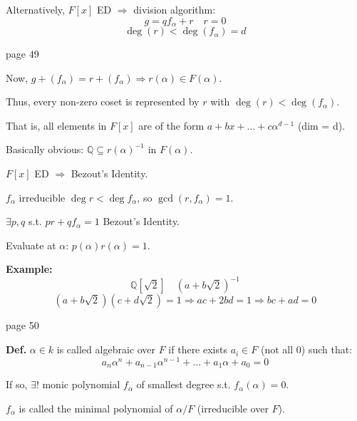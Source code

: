 \documentclass{article}
\begin{document}
Alternatively, $F[x]$ ED $\Rightarrow$ division algorithm:
\[
g = q f_\alpha + r \quad r = 0
\]
\[
\deg(r) < \deg(f_\alpha) = d
\]

\newpage
\noindent page 49

Now, $g + (f_\alpha) = r + (f_\alpha) \Rightarrow r(\alpha) \in F(\alpha)$.

Thus, every non-zero coset is represented by $r$ with $\deg(r) < \deg(f_\alpha)$.

That is, all elements in $F[x]$ are of the form $a + bx + \ldots + c \alpha^{d-1}$ (dim = d).

Basically obvious: $\mathbb{Q} \subseteq r(\alpha)^{-1}$ in $F(\alpha)$.

$F[x]$ ED $\Rightarrow$ Bezout's Identity.

$f_\alpha$ irreducible $\deg r < \deg f_\alpha$, so $\gcd(r, f_\alpha) = 1$.

$\exists p, q$ s.t. $pr + q f_\alpha = 1$ Bezout's Identity.

Evaluate at $\alpha$: $p(\alpha)r(\alpha) = 1$.

\textbf{Example:}
\[
\mathbb{Q}[\sqrt{2}] \quad (a + b\sqrt{2})^{-1}
\]
\[
(a + b\sqrt{2})(c + d\sqrt{2}) = 1 \Rightarrow ac + 2bd = 1 \Rightarrow bc + ad = 0
\]

\newpage
\noindent page 50

\textbf{Def.} $\alpha \in k$ is called algebraic over $F$ if there exists $a_i \in F$ (not all $0$) such that:
\[
a_n \alpha^n + a_{n-1} \alpha^{n-1} + \ldots + a_1 \alpha + a_0 = 0
\]

If so, $\exists!$ monic polynomial $f_\alpha$ of smallest degree s.t. $f_\alpha(\alpha) = 0$.

$f_\alpha$ is called the minimal polynomial of $\alpha / F$ (irreducible over $F$).
\end{document}
